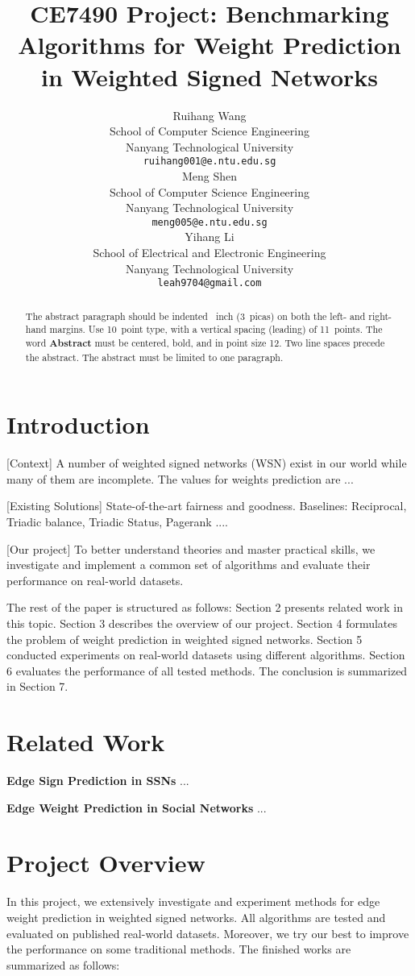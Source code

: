 \documentclass{article}
\title{CE7490 Project: Benchmarking Algorithms for Weight Prediction in Weighted Signed Networks}
\author{%
  Ruihang Wang\\
  School of Computer Science Engineering\\
  Nanyang Technological University\\
  \texttt{ruihang001@e.ntu.edu.sg} \\
  \And
  Meng Shen\\
  School of Computer Science Engineering\\
  Nanyang Technological University\\
  \texttt{meng005@e.ntu.edu.sg} \\
  \And
  Yihang Li\\
  School of Electrical and Electronic Engineering\\
  Nanyang Technological University\\
  \texttt{leah9704@gmail.com} \\
}
\begin{document}
\maketitle

\begin{abstract}
  The abstract paragraph should be indented ~inch (3~picas) on
  both the left- and right-hand margins. Use 10~point type, with a vertical
  spacing (leading) of 11~points.  The word \textbf{Abstract} must be centered,
  bold, and in point size 12. Two line spaces precede the abstract. The abstract
  must be limited to one paragraph.
\end{abstract}

\section{Introduction}

[Context] A number of weighted signed networks (WSN) exist in our world while many of them are incomplete. The values for weights prediction are ...

[Existing Solutions] State-of-the-art fairness and goodness. Baselines: Reciprocal, Triadic balance, Triadic Status, Pagerank ....

[Our project]  To better understand theories and master practical skills, we investigate and implement a common set of algorithms and evaluate their performance on real-world datasets. 

The rest of the paper is structured as follows: Section 2 presents related work in this topic. Section 3 describes the overview of our project. Section 4 formulates the problem of weight prediction in weighted signed networks. Section 5 conducted experiments on real-world datasets using different algorithms. Section 6 evaluates the performance of all tested methods. The conclusion is summarized in Section 7.


\section{Related Work}
\textbf{Edge Sign Prediction in SSNs} ...

\textbf{Edge Weight Prediction in Social Networks} ...

\section{Project Overview}

In this project, we extensively investigate and experiment methods for edge weight prediction in weighted signed networks. All algorithms are tested and evaluated on published real-world datasets. Moreover, we try our best to improve the performance on some traditional methods. The finished works are summarized as follows:
\end{document}
